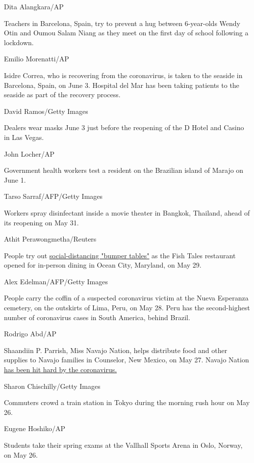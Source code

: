 Dita Alangkara/AP

Teachers in Barcelona, Spain, try to prevent a hug between 6-year-olds
Wendy Otin and Oumou Salam Niang as they meet on the first day of school
following a lockdown.

Emilio Morenatti/AP

Isidre Correa, who is recovering from the coronavirus, is taken to the
seaside in Barcelona, Spain, on June 3. Hospital del Mar has been taking
patients to the seaside as part of the recovery process.

David Ramos/Getty Images

Dealers wear masks June 3 just before the reopening of the D Hotel and
Casino in Las Vegas.

John Locher/AP

Government health workers test a resident on the Brazilian island of
Marajo on June 1.

Tarso Sarraf/AFP/Getty Images

Workers spray disinfectant inside a movie theater in Bangkok, Thailand,
ahead of its reopening on May 31.

Athit Perawongmetha/Reuters

People try out
\href{https://www.cnn.com/travel/article/coronavirus-restaurant-bumper-tables-trnd/index.html}{social-distancing
"bumper tables"} as the Fish Tales restaurant opened for in-person
dining in Ocean City, Maryland, on May 29.

Alex Edelman/AFP/Getty Images

People carry the coffin of a suspected coronavirus victim at the Nueva
Esperanza cemetery, on the outskirts of Lima, Peru, on May 28. Peru has
the second-highest number of coronavirus cases in South America, behind
Brazil.

Rodrigo Abd/AP

Shaandiin P. Parrish, Miss Navajo Nation, helps distribute food and
other supplies to Navajo families in Counselor, New Mexico, on May 27.
Navajo Nation
\href{https://www.cnn.com/2020/05/18/us/navajo-nation-infection-rate-trnd/index.html}{has
been hit hard by the coronavirus.}

Sharon Chischilly/Getty Images

Commuters crowd a train station in Tokyo during the morning rush hour on
May 26.

Eugene Hoshiko/AP

Students take their spring exams at the Vallhall Sports Arena in Oslo,
Norway, on May 26.

